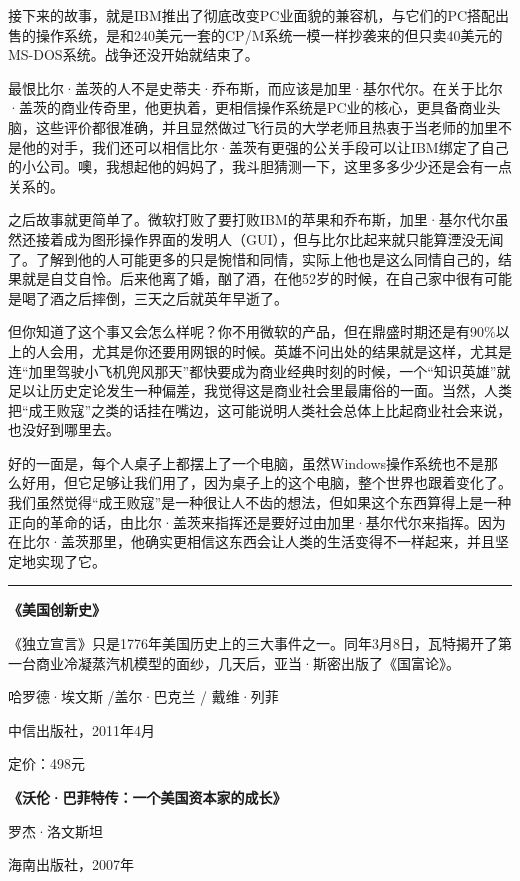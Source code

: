 接下来的故事，就是IBM推出了彻底改变PC业面貌的兼容机，与它们的PC搭配出售的操作系统，是和240美元一套的CP/M系统一模一样抄袭来的但只卖40美元的MS-DOS系统。战争还没开始就结束了。

最恨比尔·盖茨的人不是史蒂夫·乔布斯，而应该是加里·基尔代尔。在关于比尔·盖茨的商业传奇里，他更执着，更相信操作系统是PC业的核心，更具备商业头脑，这些评价都很准确，并且显然做过飞行员的大学老师且热衷于当老师的加里不是他的对手，我们还可以相信比尔·盖茨有更强的公关手段可以让IBM绑定了自己的小公司。噢，我想起他的妈妈了，我斗胆猜测一下，这里多多少少还是会有一点关系的。

之后故事就更简单了。微软打败了要打败IBM的苹果和乔布斯，加里·基尔代尔虽然还接着成为图形操作界面的发明人（GUI），但与比尔比起来就只能算湮没无闻了。了解到他的人可能更多的只是惋惜和同情，实际上他也是这么同情自己的，结果就是自艾自怜。后来他离了婚，酗了酒，在他52岁的时候，在自己家中很有可能是喝了酒之后摔倒，三天之后就英年早逝了。

但你知道了这个事又会怎么样呢？你不用微软的产品，但在鼎盛时期还是有90\%以上的人会用，尤其是你还要用网银的时候。英雄不问出处的结果就是这样，尤其是连``加里驾驶小飞机兜风那天''都快要成为商业经典时刻的时候，一个``知识英雄''就足以让历史定论发生一种偏差，我觉得这是商业社会里最庸俗的一面。当然，人类把``成王败寇''之类的话挂在嘴边，这可能说明人类社会总体上比起商业社会来说，也没好到哪里去。

好的一面是，每个人桌子上都摆上了一个电脑，虽然Windows操作系统也不是那么好用，但它足够让我们用了，因为桌子上的这个电脑，整个世界也跟着变化了。我们虽然觉得``成王败寇''是一种很让人不齿的想法，但如果这个东西算得上是一种正向的革命的话，由比尔·盖茨来指挥还是要好过由加里·基尔代尔来指挥。因为在比尔·盖茨那里，他确实更相信这东西会让人类的生活变得不一样起来，并且坚定地实现了它。

\begin{center}\rule{3in}{0.4pt}\end{center}

\textbf{《美国创新史》}

《独立宣言》只是1776年美国历史上的三大事件之一。同年3月8日，瓦特揭开了第一台商业冷凝蒸汽机模型的面纱，几天后，亚当·斯密出版了《国富论》。

哈罗德·埃文斯 /盖尔·巴克兰 / 戴维·列菲

中信出版社，2011年4月

定价：498元

\textbf{《沃伦·巴菲特传：一个美国资本家的成长》}

罗杰·洛文斯坦

海南出版社，2007年

